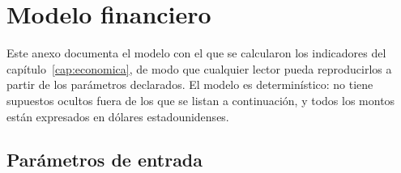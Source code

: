 
\chapter{Modelo financiero}\label{anx:modelo-financiero}

Este anexo documenta el modelo con el que se calcularon los indicadores
del capítulo~\ref{cap:economica}, de modo que cualquier lector pueda
reproducirlos a partir de los parámetros declarados. El modelo es
determinístico: no tiene supuestos ocultos fuera de los que se listan a
continuación, y todos los montos están expresados en dólares
estadounidenses.

\section{Parámetros de entrada}

